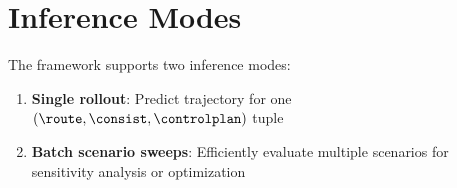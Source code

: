
\section{Inference Modes}

The framework supports two inference modes:

\begin{enumerate}
    \item \textbf{Single rollout}: Predict trajectory for one $(\route, \consist, \controlplan)$ tuple
    \item \textbf{Batch scenario sweeps}: Efficiently evaluate multiple scenarios for sensitivity analysis or optimization
\end{enumerate}

